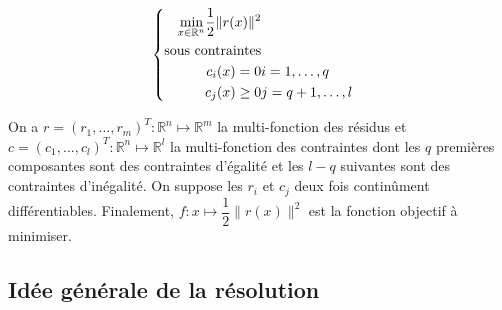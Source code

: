 \documentclass[a4paper,11pt]{article}
\numberwithin{equation}{section}
\begin{document}
\begin{equation} \label{pb}
\left\{ \begin{aligned} \underset{x \in \mathbb{R}^n}{\min}  \dfrac{1}{2}\|r(x)\|^2 \\ 
\textnormal{sous contraintes} \\
c_{i}(x) = 0& i=1,\ldots,q \\
c_{j}(x) \geq 0& j=q+1,\ldots,l  
\end{aligned} \right. 
\end{equation}

On a $r =(r_{1}, \ldots,r_{m})^{T}: \mathbb{R}^{n} \mapsto \mathbb{R}^{m}$ la multi-fonction des résidus et $c = (c_{1}, \ldots, c_{l})^{T}: \mathbb{R}^{n} \mapsto \mathbb{R}^{l}$ la multi-fonction des contraintes dont les $q$ premières composantes sont des contraintes d'égalité et les $l-q$ suivantes sont des contraintes d'inégalité. On suppose les $r_{i}$ et $c_{j}$ deux fois continûment différentiables. Finalement, $f:x\mapsto \dfrac{1}{2}\|r(x)\|^{2}$ est la fonction objectif à minimiser.

\subsection{Idée générale de la résolution}
\end{document}
